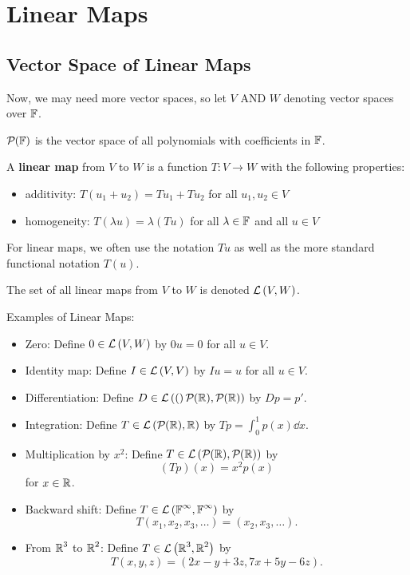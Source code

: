 
\section{Linear Maps}

\subsection{Vector Space of Linear Maps}

Now, we may need more vector spaces, so let $V$ AND $W$ denoting vector spaces
over $\operatorname{\mathbb{F}}$.

\begin{definition} [$\Polys{\F}{\empty}$]
    $\Polys{\F}{\empty}$ is the vector space of all polynomials with coefficients in $\operatorname{\mathbb{F}}$.
\end{definition}

\begin{definition} 
   A \textbf{linear map} from $V$ to $W$ is a function
   $T : V \to W$ with the following properties:
   \begin{itemize}
       \item additivity: $T(u_1 + u_2) = Tu_1 + Tu_2$ for all $u_1, u_2 \in V$
       \item homogeneity: $T(\lambda u) = \lambda(Tu)$ for all $\lambda \in \operatorname{\mathbb{F}}$ and all $u \in V$
   \end{itemize}
\end{definition}

For linear maps, we often use the
notation $Tu$ as well as the more standard functional notation
$T(u)$.

\begin{definition} [$\Lin{V, W}$]
   The set of all linear maps from $V$ to $W$ is denoted
   $\Lin{V, W}$. 
\end{definition}

\begin{example} Examples of Linear Maps:
   \begin{itemize}
       \item Zero: Define $0 \in \mathcal{L} \left( V,W \right)$ by $0u = 0$ for all $u \in V$.
       \item Identity map: Define $I \in \mathcal{L} \left( V,V \right)$ by $Iu = u$ for all $u \in V$.
       \item Differentiation: Define $D \in \Lin(\Polys{\R}{\empty}, \Polys{\R}{\empty})$ by $Dp = p'$.
       \item Integration: Define $T \in \Lin{\Polys{\R}{\empty}, \R}$ by $Tp = \int_0^1 p(x) \dd{x}$.
       \item Multiplication by $x^2$: Define $T \in \Lin{\Polys{\R}{\empty}, \Polys{\R}{\empty}}$ by
       \[ (Tp)(x) = x^2 p(x) \]
       for $x \in \operatorname{\mathbb{R}}$.
       \item Backward shift: Define $T \in \mathcal{L} \left( \operatorname{\mathbb{F}}^{\infty}, \operatorname{\mathbb{F}}^{\infty} \right)$ by
       \[ T(x_1, x_2, x_3, \dots) = (x_2, x_3, \dots). \]
       \item From $\operatorname{\mathbb{R}}^3$ to $\operatorname{\mathbb{R}}^2$: Define $T \in \mathcal{L} \left( \operatorname{\mathbb{R}}^3, \operatorname{\mathbb{R}}^2 \right)$ by
       \[ T(x, y, z) = (2x - y + 3z, 7x + 5y - 6z). \]
   \end{itemize} 
\end{example}

